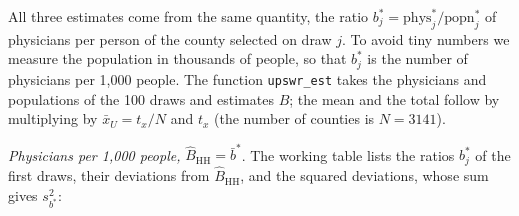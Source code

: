 \documentclass[
  letterpaper,
  DIV=11,
  numbers=noendperiod]{scrreprt}
\newenvironment{Shaded}{\begin{snugshade}}{\end{snugshade}}
\newcommand{\CommentTok}[1]{\textcolor[rgb]{0.37,0.37,0.37}{#1}}
\newcommand{\DecValTok}[1]{\textcolor[rgb]{0.68,0.00,0.00}{#1}}
\newcommand{\FunctionTok}[1]{\textcolor[rgb]{0.28,0.35,0.67}{#1}}
\newcommand{\NormalTok}[1]{\textcolor[rgb]{0.00,0.23,0.31}{#1}}
\newcommand{\OtherTok}[1]{\textcolor[rgb]{0.00,0.23,0.31}{#1}}
\newcommand{\SpecialCharTok}[1]{\textcolor[rgb]{0.37,0.37,0.37}{#1}}
\renewcommand{\[}{\begin{equation}}
\renewcommand{\]}{\end{equation}}
\begin{document}
All three estimates come from the same quantity, the ratio
\(b_j^*=\mathrm{phys}_j^*/\mathrm{popn}_j^*\) of physicians per person
of the county selected on draw \(j\). To avoid tiny numbers we measure
the population in thousands of people, so that \(b_j^*\) is the number
of physicians per 1,000 people. The function \texttt{upswr\_est} takes
the physicians and populations of the 100 draws and estimates \(B\); the
mean and the total follow by multiplying by \(\bar{x}_U=t_x/N\) and
\(t_x\) (the number of counties is \(N=3141\)).

\emph{Physicians per 1,000 people,} \(\hat{B}_{\mathrm{HH}}=\bar{b}^*\).
The working table lists the ratios \(b_j^*\) of the first draws, their
deviations from \(\hat{B}_{\mathrm{HH}}\), and the squared deviations,
whose sum gives \(s_{b^*}^2\):

\begin{Shaded}
\end{Shaded}
\end{document}
